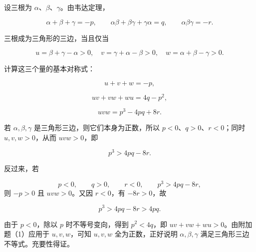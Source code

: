 \begin{answer}

设三根为 $\alpha$、$\beta$、$\gamma$。由韦达定理，

\nopagebreak[4]
\[\alpha+\beta+\gamma=-p,\qquad \alpha\beta+\beta\gamma+\gamma\alpha=q,\qquad \alpha\beta\gamma=-r.\]

三根成为三角形的三边，当且仅当

\nopagebreak[4]
\[u=\beta+\gamma-\alpha>0,\quad v=\gamma+\alpha-\beta>0,\quad w=\alpha+\beta-\gamma>0.\]

计算这三个量的基本对称式：

\nopagebreak[4]
\[u+v+w=-p,\]

\nopagebreak[4]
\[uv+vw+wu=4q-p^2,\]

\nopagebreak[4]
\[uvw=p^3-4pq+8r.\]

若 $\alpha,\beta,\gamma$ 是三角形三边，则它们本身为正数，所以 $p<0$、$q>0$、$r<0$；同时 $u,v,w>0$，从而 $uvw>0$，即

\nopagebreak[4]
\[p^3>4pq-8r.\]

反过来，若

\nopagebreak[4]
\[p<0,\qquad q>0,\qquad r<0,\qquad p^3>4pq-8r,\]
则 $-p>0$ 且 $uvw>0$。又因 $r<0$，有 $-8r>0$，故

\nopagebreak[4]
\[p^3>4pq-8r>4pq.\]

由于 $p<0$，除以 $p$ 时不等号变向，得到 $p^2<4q$，即 $uv+vw+wu>0$。由附加题（1）应用于 $u,v,w$，可知 $u,v,w$ 全为正数，正好说明 $\alpha,\beta,\gamma$ 满足三角形三边不等式。充要性得证。




\end{answer}